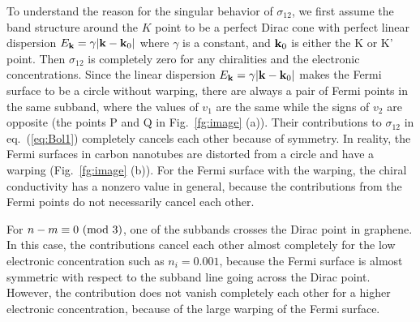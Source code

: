 \documentclass[journal=nalefd,manuscript=article,layout=twocolumn]{achemso}
\begin{document}
To understand the reason for the singular behavior of $\sigma_{12}$, we first assume the 
band structure around the $K$ point to be a perfect Dirac cone 
with perfect linear dispersion $E_{\bf k}=\gamma |{\bf k}-{\bf k}_0|$ where $\gamma$ is a constant, 
and ${\bf k}_0$ is either the K or K' point. 
Then $\sigma_{12}$ is completely zero for any chiralities and the electronic 
concentrations. Since the linear dispersion $E_{\bf k}=\gamma |{\bf k}-{\bf k}_0|$ makes the Fermi surface to be a circle without warping, there are always a pair of Fermi points in the same subband, 
where the values of $v_1$ are the same while the signs of $v_2$ are opposite (the points P and Q in  Fig.\ \ref{fg:image} (a)). Their contributions to $\sigma_{12}$ in eq.~(\ref{eq:Bol1}) 
completely cancels each other because of symmetry. 
In reality, 
the Fermi surfaces in carbon nanotubes are distorted from a circle and have a warping (Fig.\ \ref{fg:image} (b)). 
For the Fermi surface with the warping, the chiral conductivity has a nonzero value 
in general, because the contributions from the Fermi points do not necessarily 
cancel each other. 

For $n-m\equiv 0\ ({\rm mod}\ 3)$, one of the subbands crosses the Dirac point in graphene.  
In this case, the contributions cancel each other almost completely for the low electronic concentration such as $n_i=0.001$, because the Fermi surface is 
almost symmetric with respect to the subband line going across the Dirac point. 
However, the contribution does not vanish completely each other for a higher electronic 
concentration, because of the large warping of the Fermi surface.
 
\end{document}
